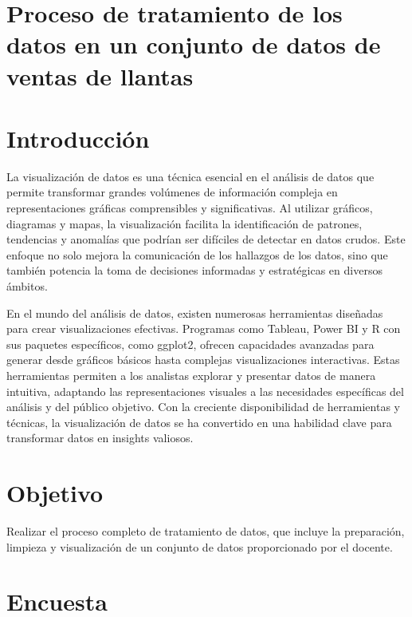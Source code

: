 \documentclass[12pt]{article}
\begin{document}
    

    \tableofcontents
    \newpage

    \section*{\centering Proceso de tratamiento de los datos en un conjunto de datos de ventas de llantas}

    \section{Introducción}
    La visualización de datos es una técnica esencial en el análisis de datos que permite transformar grandes volúmenes de información compleja en representaciones gráficas comprensibles y significativas. Al utilizar gráficos, diagramas y mapas, la visualización facilita la identificación de patrones, tendencias y anomalías que podrían ser difíciles de detectar en datos crudos. Este enfoque no solo mejora la comunicación de los hallazgos de los datos, sino que también potencia la toma de decisiones informadas y estratégicas en diversos ámbitos.

    En el mundo del análisis de datos, existen numerosas herramientas diseñadas para crear visualizaciones efectivas. Programas como Tableau, Power BI y R con sus paquetes específicos, como ggplot2, ofrecen capacidades avanzadas para generar desde gráficos básicos hasta complejas visualizaciones interactivas. Estas herramientas permiten a los analistas explorar y presentar datos de manera intuitiva, adaptando las representaciones visuales a las necesidades específicas del análisis y del público objetivo. Con la creciente disponibilidad de herramientas y técnicas, la visualización de datos se ha convertido en una habilidad clave para transformar datos en insights valiosos.

    \section{Objetivo}
        Realizar el proceso completo de tratamiento de datos, que incluye la preparación, limpieza y visualización de un conjunto de datos proporcionado por el docente.

    \section{Encuesta}
\end{document}
